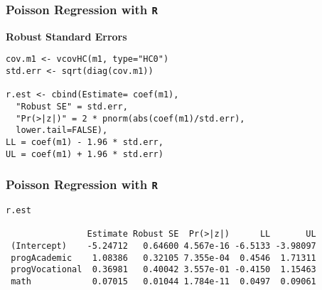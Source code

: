 \documentclass[00-GLMregslides.tex]{subfiles}
\begin{document}
\begin{frame}[fragile]

\frametitle{Poisson Regression with \texttt{R}}
\large
\textbf{Robust Standard Errors}
\begin{framed}
\begin{verbatim}
cov.m1 <- vcovHC(m1, type="HC0")
std.err <- sqrt(diag(cov.m1))

r.est <- cbind(Estimate= coef(m1), 
  "Robust SE" = std.err,
  "Pr(>|z|)" = 2 * pnorm(abs(coef(m1)/std.err), 
  lower.tail=FALSE),
LL = coef(m1) - 1.96 * std.err,
UL = coef(m1) + 1.96 * std.err)

\end{verbatim}
\end{framed}
\end{frame}

\begin{frame}[fragile]

\frametitle{Poisson Regression with \texttt{R}}
\large 

\begin{framed}
\begin{verbatim}
r.est
 
                Estimate Robust SE  Pr(>|z|)      LL       UL
 (Intercept)    -5.24712   0.64600 4.567e-16 -6.5133 -3.98097
 progAcademic    1.08386   0.32105 7.355e-04  0.4546  1.71311
 progVocational  0.36981   0.40042 3.557e-01 -0.4150  1.15463
 math            0.07015   0.01044 1.784e-11  0.0497  0.09061
\end{verbatim}
\end{framed}

\end{frame}

\end{document}
